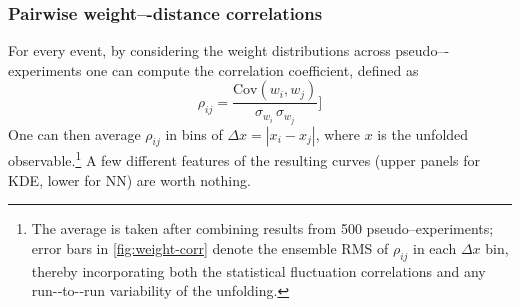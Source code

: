         \subsubsection{Pairwise weight–-distance correlations}
        For every event, by considering the weight distributions across pseudo–-experiments one can compute the correlation coefficient, defined as
        \[
            \rho_{ij} = \frac{\mathrm{Cov}(w_i,w_j)}{\sigma_{w_i}\,\sigma_{w_j}}]
        \]
        One can then average $\rho_{ij}$ in bins of $\Delta x = |x_i-x_j|$, where $x$ is the unfolded observable.\footnote{
            The average is taken after combining results from 500 pseudo–experiments; error bars in \cref{fig:weight-corr} denote the ensemble {RMS} of $\rho_{ij}$ in each $\Delta x$ bin, thereby incorporating both the statistical fluctuation correlations and any run-‐to-‐run variability of the unfolding.
            }
            A few different features of the resulting curves (upper panels for {KDE}, lower for {NN}) are worth nothing.
